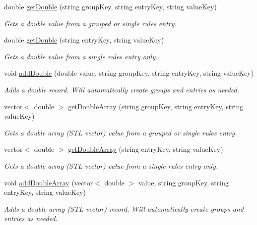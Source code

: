 \begin{DoxyCompactItemize}
double \hyperlink{class_rules_1_1_rules_container_a6e0dbfc0c46ffb0a9556623723c54597}{get\-Double} (string group\-Key, string entry\-Key, string value\-Key)
\begin{DoxyCompactList}\small\item\em Gets a double value from a grouped or single rules entry. \end{DoxyCompactList}\item 
double \hyperlink{class_rules_1_1_rules_container_aea3e4ac2297f82cf34f4fdbc1d1a50e9}{get\-Double} (string entry\-Key, string value\-Key)
\begin{DoxyCompactList}\small\item\em Gets a double value from a single rules entry only. \end{DoxyCompactList}\item 
void \hyperlink{class_rules_1_1_rules_container_afd09a98cb51bfa71ec6f1107878d7568}{add\-Double} (double value, string group\-Key, string entry\-Key, string value\-Key)
\begin{DoxyCompactList}\small\item\em Adds a double record. Will automatically create groups and entries as needed. \end{DoxyCompactList}\item 
vector$<$ double $>$ \hyperlink{class_rules_1_1_rules_container_a3a63291a418002e075fd5bbf3370c0d8}{get\-Double\-Array} (string group\-Key, string entry\-Key, string value\-Key)
\begin{DoxyCompactList}\small\item\em Gets a double array (S\-T\-L vector) value from a grouped or single rules entry. \end{DoxyCompactList}\item 
vector$<$ double $>$ \hyperlink{class_rules_1_1_rules_container_af366a4e784f723be54d2f5da301f59ff}{get\-Double\-Array} (string entry\-Key, string value\-Key)
\begin{DoxyCompactList}\small\item\em Gets a double array (S\-T\-L vector) value from a single rules entry only. \end{DoxyCompactList}\item 
void \hyperlink{class_rules_1_1_rules_container_acf6173b4cfef7a9aaa04ac27c4782007}{add\-Double\-Array} (vector$<$ double $>$ value, string group\-Key, string entry\-Key, string value\-Key)
\begin{DoxyCompactList}\small\item\em Adds a double array (S\-T\-L vector) record. Will automatically create groups and entries as needed. \end{DoxyCompactList}\item 

\end{DoxyCompactItemize}
